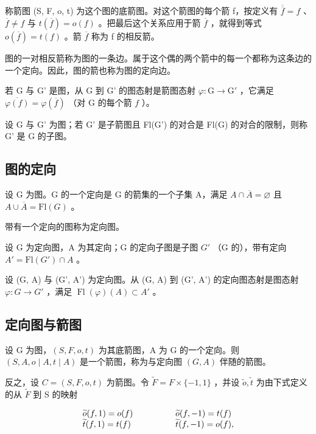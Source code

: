 称箭图 (S, F, o, t) 为这个图的底箭图。对这个箭图的每个箭 f，按定义有 \(\overline{\overline{f}} = f\) 、\(\overline{f} \neq f\) 与 \(t(\overline{f}) = o(f)\) 。把最后这个关系应用于箭 \(\overline{f}\) ，就得到等式 \(o(\overline{f}) = t(f)\) 。箭 \(\overline{f}\) 称为 f 的相反箭。

图的一对相反箭称为图的一条边。属于这个偶的两个箭中的每一个都称为这条边的一个定向。因此，图的箭也称为图的定向边。

若 G 与 G' 是图，从 G 到 G' 的图态射是箭图态射 \(\varphi\colon\mathrm{G}\to\mathrm{G}'\) ，它满足 \(\overline{\varphi(f)}=\varphi(\overline{f})\) （对 G 的每个箭 \(f\) ）。

设 G 与 G' 为图；若 G' 是子箭图且 Fl(G') 的对合是 Fl(G) 的对合的限制，则称 G' 是 G 的子图。

\subsection{图的定向}

设 G 为图。G 的一个定向是 G 的箭集的一个子集 A，满足 \(A \cap \overline{A} = \varnothing\) 且 \(A \cup \overline{A} = \mathrm{Fl}(G)\) 。

带有一个定向的图称为定向图。

设 G 为定向图，A 为其定向；G 的定向子图是子图 \(G'\) （G 的），带有定向 \(A' = \mathrm{Fl}(G') \cap A\) 。

设 (G, A) 与 (G', A') 为定向图。从 (G, A) 到 (G', A') 的定向图态射是图态射 \(\varphi\colon G \to G'\) ，满足 \(\operatorname{Fl}(\varphi)(A) \subset A'\) 。

\subsection{定向图与箭图}

设 G 为图，\((S,F,o,t)\) 为其底箭图，A 为 G 的一个定向。则 \((S,A,o\mid A,t\mid A)\) 是一个箭图，称为与定向图 \((G,A)\) 伴随的箭图。

反之，设 \(C = (S, F, o, t)\) 为箭图。令 \(\widetilde{F} = F \times \{-1, 1\}\) ，并设 \(\widetilde{o}, \widetilde{t}\) 为由下式定义的从 \(\widetilde{F}\) 到 S 的映射

\[
\begin{array}{l l} \widetilde {o} (f, 1) = o (f) & \qquad \qquad \widetilde {o} (f, - 1) = t (f) \\ \widetilde {t} (f, 1) = t (f) & \qquad \qquad \widetilde {t} (f, - 1) = o (f), \end{array}
\]

